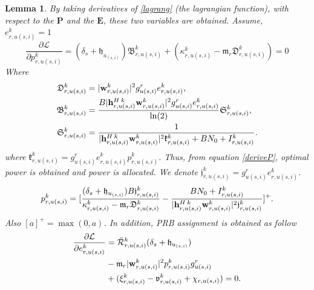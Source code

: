 \documentclass[conference]{IEEEtran}
\newtheorem{lemma}{Lemma}
\begin{document}
\begin{lemma}
By taking derivatives of \eqref{lagrang} (the lagrangian function), with respect to the $\boldsymbol{P}$ and the $\boldsymbol{E}$, these two variables are obtained.
Assume, $e_{r,u(s,i)}^{k} = 1$
\begin{equation}\label{deriveP}
\dfrac{\partial\mathcal{L}}{\partial p_{r,u(s,i)}^{k}} = (\delta_s + \mathfrak{h}_{u_{(s,i)}})\mathfrak{B}_{r,u(s,i)}^{k} + (\kappa^k_{r,u(s,i)} -\mathfrak{m}_{r}\mathfrak{D}_{r,u(s,i)}^{k})=0
\end{equation}
Where
\begin{equation}
\begin{split}
\mathfrak{D}_{r,u(s,i)}^{k} &= |\bold{w}_{r,u(s,i)}^{k}|^2 g_{u(s,i)}^r e^k_{r,u(s,i)}, \\
\mathfrak{B}_{r,u(s,i)}^{k} &= \frac{B |{\bold{h}_{r,u(s,i)}^{H \: k}} \bold{w}_{r,u(s,i)}^{k}|^2 g_{u(s,i)}^r e_{r,u(s,i)}^{k}}{\ln(2)} \mathfrak{S}_{r,u(s,i)}^{k},\\
\mathfrak{S}_{r,u(s,i)}^{k} &= \frac{1}{{|\bold{h}_{r,u(s,i)}^{H \: k}} \bold{w}_{r,u(s,i)}^{k}|^2 \mathfrak{k}_{r,u(s,i)}^{k}+BN_0 + I_{r,u(s,i)}^{k}}.\\
\end{split}
\end{equation}
where $\mathfrak{k}_{r,u(s,i)}^{k} = g_{u(s,i)}^r e_{r,u(s,i)}^{k}p_{r,u(s,i)}^{k}$.
Thus, from equation \eqref{deriveP}, optimal power is obtained and power is allocated.
We denote $ \mathfrak{j}_{r,u(s,i)}^{k} = g_{u(s,i)}^r e_{r,u(s,i)}^{k}$.
\begin{equation}
p_{r,u(s,i)}^{k} = [\frac{(\delta_s + \mathfrak{h}_{u_{(s,i)}})B \mathfrak{j}_{r,u(s,i)}^{k}}{\kappa^k_{r,u(s,i)} -\mathfrak{m}_{r}\mathfrak{D}_{r,u(s,i)}^{k}} -\frac{BN_0 + I_{r,u(s,i)}^{k}}{{|\bold{h}_{r,u(s,i)}^{H \: k}} \bold{w}_{r,u(s,i)}^{k}|^2\mathfrak{j}_{r,u(s,i)}^{k}}]^+.
\end{equation}
Also $[a]^+ = \max(0,a)$.
In addition, PRB assignment is obtained as follow
\begin{equation}\label{deriveE}
\begin{split}
\dfrac{\partial\mathcal{L}}{\partial e_{r,u(s,i)}^{k}} &= \mathcal{\bar{R}}_{r,u(s,i)}^{k}(\delta_s+\mathfrak{h}_{u_{(s,i)}})\\
&- \mathfrak{m}_{r}|\bold{w}_{r,u(s,i)}^{k}|^2 p_{r,u(s,i)}^{k} g_{u(s,i)}^r\\
&+( \xi^{k}_{r,u(s,i)}-\mathfrak{v}^{k}_{r,u(s,i)} +\chi_{r,u(s,i)})=0.\\
\end{split}

\end{equation}
\end{lemma}
\end{document}
